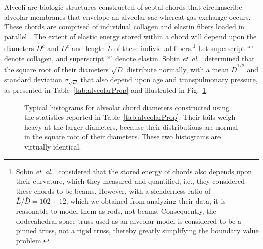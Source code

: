 Alveoli are biologic structures constructed of septal chords that circumscribe alveolar membranes that envelope an alveolar sac whereat gas exchange occurs.  These chords are comprised of individual collagen and elastin fibers loaded in parallel \cite{Matsudaetal87,Sobinetal88}.  The extent of elastic energy stored within a chord will depend upon the diameters $D^c$ and $D^e$ and length $L$ of these individual fibers.\footnote{
	Sobin \textit{et~al}.\ \cite{Sobinetal88} considered that the stored energy of chords also depends upon their curvature, which they measured and quantified, i.e., they considered these chords to be beams.  However, with a slenderness ratio of $\bar{L}/\bar{D} = 102 \pm 12$, which we obtained from analyzing their data, it is reasonable to model them as rods, not beams.  Consequently, the dodecahedral space truss used as an alveolar model is considered to be a pinned truss, not a rigid truss, thereby greatly simplifying the boundary value problem.
}
Let superscript `$\mbox{}^c$' denote collagen, and superscript `$\mbox{}^e$' denote elastin.  Sobin \textit{et~al}.\ \cite{Sobinetal88} determined that the square root of their diameters $\sqrt{D}$ distribute normally, with a mean $\bar{D}^{1/2}$ and standard deviation $\sigma_{\sqrt{D}}$ that also depend upon age and transpulmonary pressure, as presented in Table~\ref{tab:alveolarProp} and illustrated in Fig.~\ref{fig:septalChordStats}. 

\begin{figure}
    \centering
    \hfill
    \caption{Typical histograms for alveolar chord diameters constructed using the statistics reported in Table~\ref{tab:alveolarProp}.  Their tails weigh heavy at the larger diameters, because their distributions are normal in the square root of their diameters.  These two histograms are virtually identical.}
    \label{fig:septalChordStats}
\end{figure}

